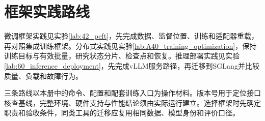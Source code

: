 \section*{框架实践路线}
微调框架实践见实验\ref{lab:42_peft}，先完成数据、监督位置、训练和适配器重载，再对照集成训练框架。分布式实践见实验\ref{lab:A40_training_optimization}，保持训练目标与有效批量，研究状态分片、检查点和恢复。推理部署实践见实验\ref{lab:60_inference_deployment}，先完成vLLM服务路径，再迁移到SGLang并比较质量、负载和故障行为。

三条路线以本册中的命令、配置和配套训练入口为操作材料。版本号用于定位接口核查基线，完整环境、硬件支持与性能结论须由实际运行建立。选择框架时先确定职责和验收条件，同类工具的迁移应复用相同数据、模型身份和评价口径。
